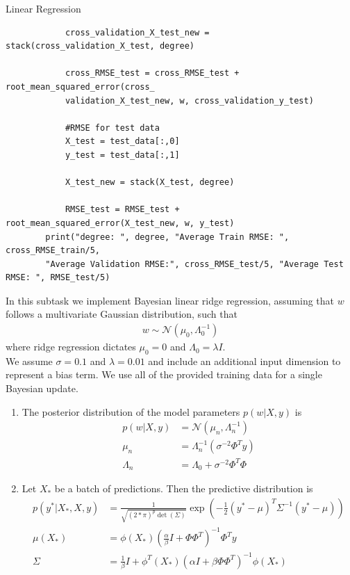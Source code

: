 \begin{task}{Linear Regression}
\begin{subtask}
\begin{lstlisting}
            cross_validation_X_test_new = stack(cross_validation_X_test, degree)
            
            cross_RMSE_test = cross_RMSE_test + root_mean_squared_error(cross_
            validation_X_test_new, w, cross_validation_y_test)
            
            #RMSE for test data
            X_test = test_data[:,0]
            y_test = test_data[:,1]
            
            X_test_new = stack(X_test, degree)
            
            RMSE_test = RMSE_test + root_mean_squared_error(X_test_new, w, y_test)
        print("degree: ", degree, "Average Train RMSE: ", cross_RMSE_train/5, 
        "Average Validation RMSE:", cross_RMSE_test/5, "Average Test RMSE: ", RMSE_test/5)
\end{lstlisting}
\end{subtask}
\begin{subtask}
In this subtask we implement Bayesian linear ridge regression, assuming that $w$ follows a multivariate Gaussian distribution, such that
\begin{align*}
w \sim \mathcal{N}(\mu_0, \Lambda_0^{-1})
\end{align*}
where ridge regression dictates $\mu_0 = 0$ and $\Lambda_0 = \lambda I$. \\
We assume $\sigma = 0.1$ and $\lambda = 0.01$ and include an additional input dimension to represent a bias term. We use all of the provided training data for a single Bayesian update. 
\begin{enumerate}
\item The posterior distribution of the model parameters $p(w | X,y)$ is
\begin{align*}
p(w|X,y) &= \mathcal{N}(\mu_n, \Lambda_n^{-1}) \\
\mu_n &= \Lambda_n^{-1}(\sigma^{-2} \Phi^Ty) \\
\Lambda_n &= \Lambda_0 + \sigma^{-2} \Phi^T \Phi %
\end{align*}
\item Let $X_{*}$ be a batch of predictions. Then the predictive distribution is
\begin{align*}
p(y^{*}|X_{*}, X, y) &= \frac{1}{\sqrt{(2*\pi)^p \det(\Sigma)}} \exp (-\frac{1}{2} (y^*-\mu)^T \Sigma^{-1} (y^* - \mu)) \\
\mu(X_*) &= \phi(X_*) (\frac{\alpha}{\beta}I + \Phi \Phi^T)^{-1}\Phi^Ty \\
\Sigma &= \frac{1}{\beta} I + \phi^T(X_*)(\alpha I+ \beta \Phi \Phi^T)^{-1}\phi(X_*)

\end{align*}
\end{enumerate}
\end{subtask}
\end{task}
